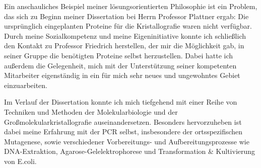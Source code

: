 
Ein anschauliches Beispiel meiner lösungsorientierten Philosophie ist ein Problem, das sich zu Beginn meiner Dissertation bei Herrn Professor Plattner ergab: Die ursprünglich eingeplanten Proteine für die Kristallografie waren nicht verfügbar. Durch meine Sozialkompetenz und meine Eigeninitiative konnte ich schließlich den Kontakt zu Professor Friedrich herstellen, der mir die Möglichkeit gab, in seiner Gruppe die benötigten Proteine selbst herzustellen. Dabei hatte ich außerdem die Gelegenheit, mich mit der Unterstützung seiner kompetenten Mitarbeiter eigenständig in ein für mich sehr neues und ungewohntes Gebiet einzuarbeiten.\par
Im Verlauf der Dissertation konnte ich mich tiefgehend mit einer Reihe von Techniken und Methoden der Molekularbiologie und der Großmolekularkristallografie auseinandersetzen. Besonders hervorzuheben ist dabei meine Erfahrung mit der PCR selbst, insbesondere der ortsspezifischen Mutagenese, sowie verschiedener Vorbereitungs- und Aufbereitungsprozesse wie DNA-Extraktion, Agarose-Gelelektrophorese und Transformation \& Kultivierung von E.coli.
